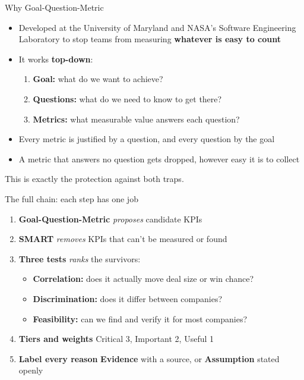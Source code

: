 \documentclass[aspectratio=169,11pt]{beamer}
\newcommand{\ev}{\textcolor{accent}{\textbf{Evidence}}}
\newcommand{\as}{\textcolor{assume}{\textbf{Assumption}}}
\begin{document}
\begin{frame}{Why Goal-Question-Metric}
  \begin{itemize}
    \item Developed at the University of Maryland and NASA's Software Engineering Laboratory
          to stop teams from measuring \textbf{whatever is easy to count}
    \item It works \textbf{top-down}:
      \begin{enumerate}
        \item \textbf{Goal:} what do we want to achieve?
        \item \textbf{Questions:} what do we need to know to get there?
        \item \textbf{Metrics:} what measurable value answers each question?
      \end{enumerate}
    \item Every metric is justified by a question, and every question by the goal
    \item A metric that answers no question gets dropped, however easy it is to collect
  \end{itemize}
  \vspace{0.5em}
  This is exactly the protection against both traps.
\end{frame}

\begin{frame}{The full chain: each step has one job}
  \begin{enumerate}
    \item \textbf{Goal-Question-Metric} \textrightarrow{} \emph{proposes} candidate KPIs
    \item \textbf{SMART} \textrightarrow{} \emph{removes} KPIs that can't be measured or found
    \item \textbf{Three tests} \textrightarrow{} \emph{ranks} the survivors:
      \begin{itemize}
        \item \textbf{Correlation:} does it actually move deal size or win chance?
        \item \textbf{Discrimination:} does it differ between companies?
        \item \textbf{Feasibility:} can we find and verify it for most companies?
      \end{itemize}
    \item \textbf{Tiers and weights} \textrightarrow{} Critical 3, Important 2, Useful 1
    \item \textbf{Label every reason} \textrightarrow{} \ev{} with a source, or \as{} stated openly
  \end{enumerate}
\end{frame}
\end{document}
